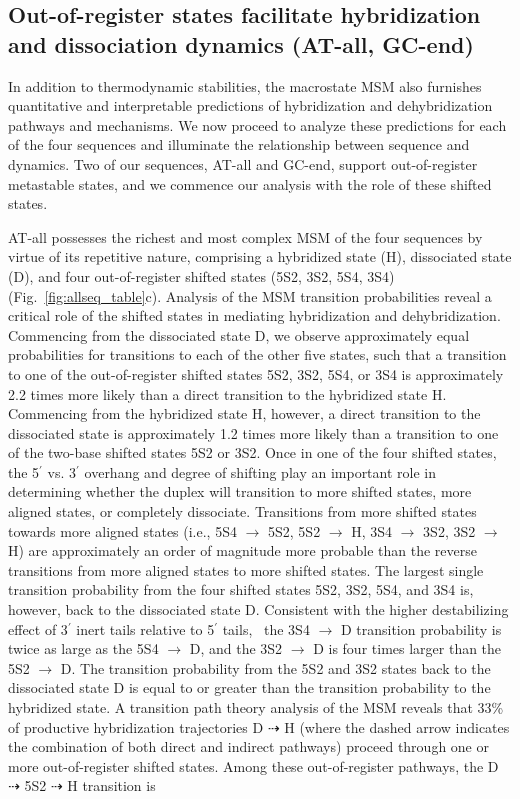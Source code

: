 \documentclass[journal=jpcbfk,manuscript=article]{achemso}
\begin{document}
\subsection{Out-of-register states facilitate hybridization and dissociation dynamics (AT-all, GC-end)}

In addition to thermodynamic stabilities, the macrostate MSM also furnishes quantitative and interpretable predictions of hybridization and dehybridization pathways and mechanisms. We now proceed to analyze these predictions for each of the four sequences and illuminate the relationship between sequence and dynamics. Two of our sequences, AT-all and GC-end, support out-of-register metastable states, and we commence our analysis with the role of these shifted states.

AT-all possesses the richest and most complex MSM of the four sequences by virtue of its repetitive nature, comprising a hybridized state (H), dissociated state (D), and four out-of-register shifted states (5S2, 3S2, 5S4, 3S4) (Fig.~\ref{fig:allseq_table}c). Analysis of the MSM transition probabilities reveal a critical role of the shifted states in mediating hybridization and dehybridization. Commencing from the dissociated state D, we observe approximately equal probabilities for transitions to each of the other five states, such that a transition to one of the out-of-register shifted states 5S2, 3S2, 5S4, or 3S4 is approximately 2.2 times more likely than a direct transition to the hybridized state H. Commencing from the hybridized state H, however, a direct transition to the dissociated state is approximately 1.2 times more likely than a transition to one of the two-base shifted states 5S2 or 3S2. Once in one of the four shifted states, the 5$^\prime$ vs. 3$^\prime$ overhang and degree of shifting play an important role in determining whether the duplex will transition to more shifted states, more aligned states, or completely dissociate. Transitions from more shifted states towards more aligned states (i.e., 5S4 $\rightarrow$ 5S2, 5S2 $\rightarrow$ H, 3S4 $\rightarrow$ 3S2, 3S2 $\rightarrow$ H) are approximately an order of magnitude more probable than the reverse transitions from more aligned states to more shifted states. The largest single transition probability from the four shifted states 5S2, 3S2, 5S4, and 3S4 is, however, back to the dissociated state D. Consistent with the higher destabilizing effect of 3$^\prime$ inert tails relative to 5$^\prime$ tails,~\citep{Doktycz1990ThermodynamicATGC, Dickman2012ThermodynamicDNAs, Michele2014EHybridization} the 3S4 $\rightarrow$ D transition probability is twice as large as the 5S4 $\rightarrow$ D, and the 3S2 $\rightarrow$ D is four times larger than the 5S2 $\rightarrow$ D. The transition probability from the 5S2 and 3S2 states back to the dissociated state D is equal to or greater than the transition probability to the hybridized state. A transition path theory analysis of the MSM reveals that 33\% of productive hybridization trajectories D $\dashrightarrow$ H (where the dashed arrow indicates the combination of both direct and indirect pathways) proceed through one or more out-of-register shifted states. Among these out-of-register pathways, the D $\dashrightarrow$ 5S2 $\dashrightarrow$ H transition is 
\end{document}
